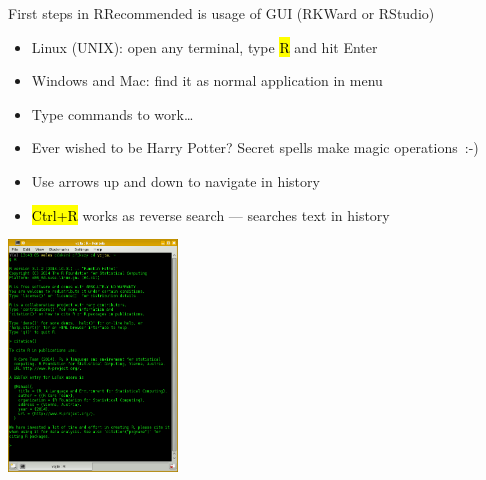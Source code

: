\documentclass[compress, ucs, xelatex, 11pt, xcolor=svgnames,
  hyperref={
    bookmarks=true,
    unicode=true,
    colorlinks=true,
    pdftitle={Molecular data in R},
    plainpages=false,
    pdfauthor={Vojtech Zeisek},
    pdfsubject={Course about phylogeny and evolution in R},
    pdfcreator={XeLaTeX},
    pdfkeywords={R, evolution, phylogeny, molecular data},
    linkcolor=Tomato,
    anchorcolor=SaddleBrown,
    citecolor=Goldenrod,
    filecolor=DarkMagenta,
    menucolor=Sienna,
    urlcolor=DarkTurquoise,
    pdftex},
  url={hyphens, lowtilde} %
  ]{beamer}
\renewcommand{\texttt}[1]{\hl{\ttfamily #1}}
\begin{document}
\begin{frame}{First steps in R}{Recommended is usage of GUI (RKWard or RStudio)}
  \begin{multicols}{2}
    \begin{itemize}
      \item Linux (UNIX): open any terminal, type \texttt{R} and hit Enter
      \item Windows and Mac: find it as normal application in menu
      \item Type commands to work\ldots
      \item \alert{Ever wished to be Harry Potter? Secret spells make magic operations~:-)}
      \item Use arrows up and down to navigate in history
      \item \texttt{Ctrl+R} works as reverse search --- searches text in history
    \end{itemize}
    \columnbreak
    \begin{center}
      \includegraphics[width=4.5cm]{rkonsole.png}
    \end{center}
  \end{multicols}
\end{frame}
\end{document}
